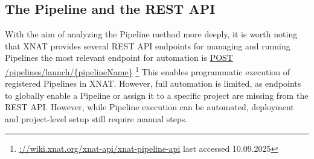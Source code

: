 \subsection{The Pipeline and the REST API}
With the aim of analyzing the Pipeline method more deeply, it is worth noting that XNAT provides several REST API endpoints for managing and running Pipelines the most relevant endpoint for automation is \url{POST /pipelines/launch/{pipelineName}} \footnote{\url{://wiki.xnat.org/xnat-api/xnat-pipeline-api} last accessed 10.09.2025}
This enables programmatic execution of registered Pipelines in XNAT. However, full automation is limited, as endpoints to globally enable a Pipeline or assign it to a specific project are missing from the REST API. However, while Pipeline execution can be automated, deployment and project-level setup still require manual steps.



